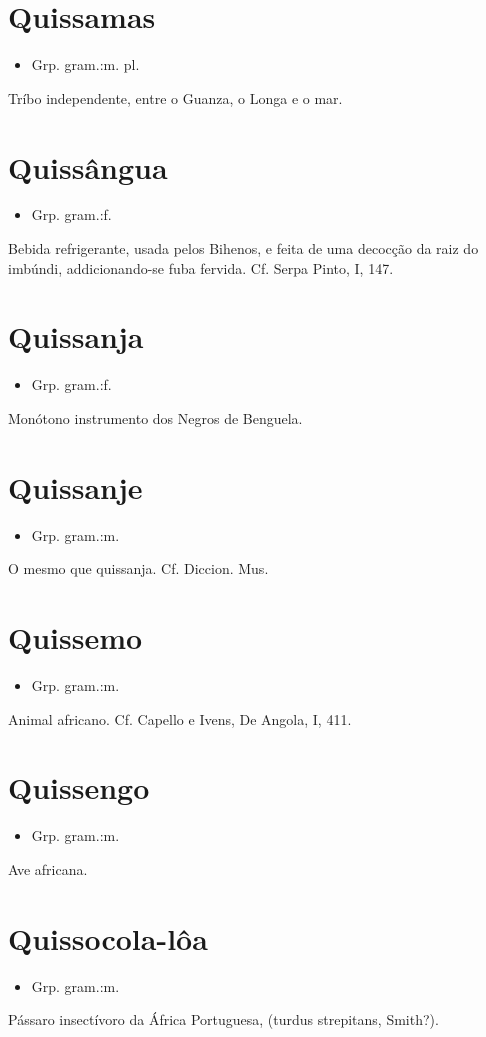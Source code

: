 \section{Quissamas}
\begin{itemize}
\item {Grp. gram.:m. pl.}
\end{itemize}
Tríbo independente, entre o Guanza, o Longa e o mar.
\section{Quissângua}
\begin{itemize}
\item {Grp. gram.:f.}
\end{itemize}
Bebida refrigerante, usada pelos Bihenos, e feita de uma decocção da raiz do imbúndi, addicionando-se fuba fervida. Cf. Serpa Pinto, I, 147.
\section{Quissanja}
\begin{itemize}
\item {Grp. gram.:f.}
\end{itemize}
Monótono instrumento dos Negros de Benguela.
\section{Quissanje}
\begin{itemize}
\item {Grp. gram.:m.}
\end{itemize}
O mesmo que \textunderscore quissanja\textunderscore . Cf. \textunderscore Diccion. Mus.\textunderscore 
\section{Quissemo}
\begin{itemize}
\item {Grp. gram.:m.}
\end{itemize}
Animal africano. Cf. Capello e Ivens, \textunderscore De Angola\textunderscore , I, 411.
\section{Quissengo}
\begin{itemize}
\item {Grp. gram.:m.}
\end{itemize}
Ave africana.
\section{Quissocola-lôa}
\begin{itemize}
\item {Grp. gram.:m.}
\end{itemize}
Pássaro insectívoro da África Portuguesa, (\textunderscore turdus strepitans\textunderscore , Smith?).
